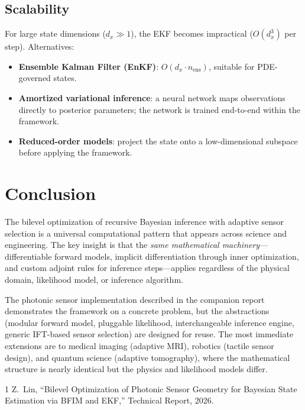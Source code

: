 \documentclass[11pt,a4paper]{article}
\begin{document}
\subsection{Scalability}

For large state dimensions ($d_x \gg 1$), the EKF becomes impractical ($O(d_x^3)$ per step).  Alternatives:
\begin{itemize}[nosep]
  \item \textbf{Ensemble Kalman Filter (EnKF)}: $O(d_x \cdot n_{\text{ens}})$, suitable for PDE-governed states.
  \item \textbf{Amortized variational inference}: a neural network maps observations directly to posterior parameters; the network is trained end-to-end within the framework.
  \item \textbf{Reduced-order models}: project the state onto a low-dimensional subspace before applying the framework.
\end{itemize}

\section{Conclusion}

The bilevel optimization of recursive Bayesian inference with adaptive sensor selection is a universal computational pattern that appears across science and engineering.  The key insight is that the \emph{same mathematical machinery}---differentiable forward models, implicit differentiation through inner optimization, and custom adjoint rules for inference steps---applies regardless of the physical domain, likelihood model, or inference algorithm.

The photonic sensor implementation described in the companion report~\cite{report} demonstrates the framework on a concrete problem, but the abstractions (modular forward model, pluggable likelihood, interchangeable inference engine, generic IFT-based sensor selection) are designed for reuse.  The most immediate extensions are to medical imaging (adaptive MRI), robotics (tactile sensor design), and quantum science (adaptive tomography), where the mathematical structure is nearly identical but the physics and likelihood models differ.

\begin{thebibliography}{1}
 Z.~Lin, ``Bilevel Optimization of Photonic Sensor Geometry for Bayesian State Estimation via BFIM and EKF,'' Technical Report, 2026.
\end{thebibliography}
\end{document}
